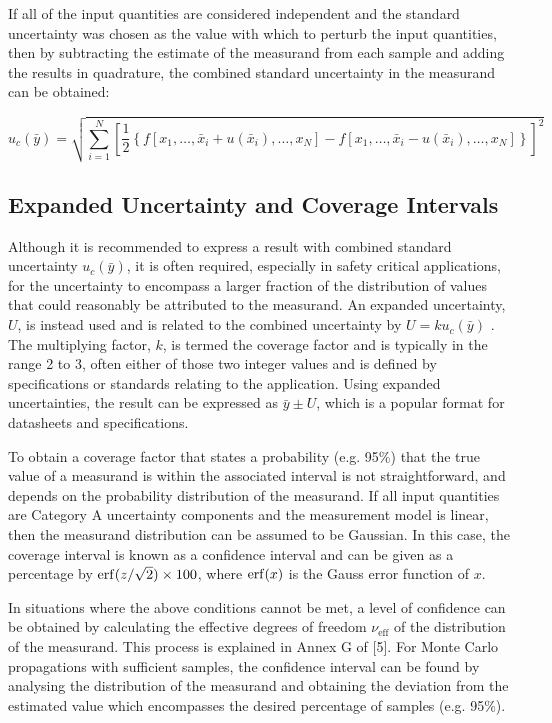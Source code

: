\documentclass[../thesis/thesis.tex]{subfiles}
\begin{document}
If all of the input quantities are considered independent and the standard uncertainty was chosen as the value with which to perturb the input quantities, then by subtracting the estimate of the measurand from each sample and adding the results in quadrature, the combined standard uncertainty in the measurand can be obtained:

\begin{equation}
u_c(\bar{y}) = \sqrt{\sum_{i=1}^{N}\left[\frac{1}{2}\left\lbrace f\left[x_1,\dots,\bar{x}_i+u(\bar{x}_i),\dots,x_N\right]-f\left[x_1,\dots,\bar{x}_i-u(\bar{x}_i),\dots,x_N\right]\right\rbrace\right]^2}
\end{equation}

\subsection{Expanded Uncertainty and Coverage Intervals}

Although it is recommended to express a result with combined standard uncertainty $u_c({\bar{y}})$, it is often required, especially in safety critical applications, for the uncertainty to encompass a larger fraction of the distribution of values that could reasonably be attributed to the measurand. An expanded uncertainty, $U$, is instead used and is related to the combined uncertainty by $U=ku_c(\bar{y})$ \cite[6.2.1]{GUM_2008}. The multiplying factor, $k$, is termed the coverage factor and is typically in the range 2 to 3, often either of those two integer values and is defined by specifications or standards relating to the application.  Using expanded uncertainties, the result can be expressed as $\bar{y} \pm U$, which is a popular format for datasheets and specifications.

To obtain a coverage factor that states a probability (e.g. 95\%) that the true value of a measurand is within the associated interval is not straightforward, and depends on the probability distribution of the measurand. If all input quantities are Category A uncertainty components and the measurement model is linear, then the measurand distribution can be assumed to be Gaussian. In this case, the coverage interval is known as a confidence interval and can be given as a percentage by  $\operatorname{erf}(z/\sqrt{2})\times 100$, where $\operatorname{erf}(x)$ is the Gauss error function of $x$.
 
In situations where the above conditions cannot be met, a level of confidence can be obtained by calculating the effective degrees of freedom $\nu_\text{eff}$ of the distribution of the measurand. This process is explained in Annex G of [5]. For Monte Carlo propagations with sufficient samples, the confidence interval can be found by analysing the distribution of the measurand and obtaining the deviation from the estimated value which encompasses the desired percentage of samples (e.g. 95\%).
\end{document}
